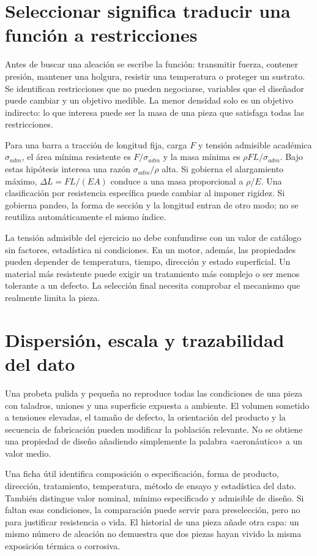 
\section{Seleccionar significa traducir una función a restricciones}
Antes de buscar una aleación se escribe la función: transmitir fuerza, contener presión, mantener una holgura, resistir una temperatura o proteger un sustrato. Se identifican restricciones que no pueden negociarse, variables que el diseñador puede cambiar y un objetivo medible. La menor densidad solo es un objetivo indirecto: lo que interesa puede ser la masa de una pieza que satisfaga todas las restricciones.

Para una barra a tracción de longitud fija, carga $F$ y tensión admisible académica $\sigma_{adm}$, el área mínima resistente es $F/\sigma_{adm}$ y la masa mínima es $\rho FL/\sigma_{adm}$. Bajo estas hipótesis interesa una razón $\sigma_{adm}/\rho$ alta. Si gobierna el alargamiento máximo, $\Delta L=FL/(EA)$ conduce a una masa proporcional a $\rho/E$. Una clasificación por resistencia específica puede cambiar al imponer rigidez. Si gobierna pandeo, la forma de sección y la longitud entran de otro modo; no se reutiliza automáticamente el mismo índice.

La tensión admisible del ejercicio no debe confundirse con un valor de catálogo sin factores, estadística ni condiciones. En un motor, además, las propiedades pueden depender de temperatura, tiempo, dirección y estado superficial. Un material más resistente puede exigir un tratamiento más complejo o ser menos tolerante a un defecto. La selección final necesita comprobar el mecanismo que realmente limita la pieza.
\section{Dispersión, escala y trazabilidad del dato}
Una probeta pulida y pequeña no reproduce todas las condiciones de una pieza con taladros, uniones y una superficie expuesta a ambiente. El volumen sometido a tensiones elevadas, el tamaño de defecto, la orientación del producto y la secuencia de fabricación pueden modificar la población relevante. No se obtiene una propiedad de diseño añadiendo simplemente la palabra «aeronáutico» a un valor medio.

Una ficha útil identifica composición o especificación, forma de producto, dirección, tratamiento, temperatura, método de ensayo y estadística del dato. También distingue valor nominal, mínimo especificado y admisible de diseño. Si faltan esas condiciones, la comparación puede servir para preselección, pero no para justificar resistencia o vida. El historial de una pieza añade otra capa: un mismo número de aleación no demuestra que dos piezas hayan vivido la misma exposición térmica o corrosiva.
